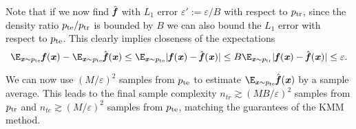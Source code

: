 Note that if we now find $\hat{\boldsymbol{\mathit{f}}}$ with $L_1$ error $\varepsilon':= \varepsilon/B$ with respect to $p_{\mathrm{tr}}$, since the density ratio $p_{\mathrm{te}}/p_{\mathrm{tr}}$ is bounded by $B$ we can also bound the $L_1$ error with respect to $p_{\mathrm{te}}$. This clearly implies closeness of the expectations
\begin{equation*}
    \E_{\xx \sim \pte} \ff(\xx) - \E_{\xx \sim \pte} \hat{\ff}(\xx) \leq \E_{\xx \sim \pte} |\ff(\xx) - \hat{\ff}(\xx)| \leq B \E_{\xx \sim \ptr} |\ff(\xx) - \hat{\ff}(\xx)| \leq \varepsilon.
\end{equation*}

We can now use $(M/\varepsilon)^2$ samples from $p_{\mathrm{te}}$ to estimate $\E_{\xx \sim \pte} \hat{\ff}(\xx)$ by a sample average. This leads to the final sample complexity $n_{tr} \gtrsim (MB/\varepsilon)^2$ samples from $p_{\mathrm{tr}}$ and $n_{te} \gtrsim (M/\varepsilon)^2$ samples from $p_{\mathrm{te}}$, matching the guarantees of the KMM method.
